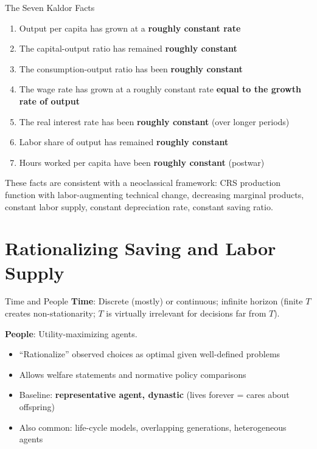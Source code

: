 \documentclass[blue]{beamer}
\begin{document}
\begin{frame}{The Seven Kaldor Facts}
	\begin{enumerate}
		\item Output per capita has grown at a \textbf{roughly constant rate}
		\item The capital-output ratio has remained \textbf{roughly constant}
		\item The consumption-output ratio has been \textbf{roughly constant}
		\item The wage rate has grown at a roughly constant rate \textbf{equal to the growth rate of output}
		\item The real interest rate has been \textbf{roughly constant} (over longer periods)
		\item Labor share of output has remained \textbf{roughly constant}
		\item Hours worked per capita have been \textbf{roughly constant} (postwar)
	\end{enumerate}
	These facts are consistent with a neoclassical framework: CRS production function with labor-augmenting technical change, decreasing marginal products, constant labor supply, constant depreciation rate, constant saving ratio.
\end{frame}
\section{Rationalizing Saving and Labor Supply}

\begin{frame}{Time and People}
	\textbf{Time}: Discrete (mostly) or continuous; infinite horizon (finite $T$ creates non-stationarity; $T$ is virtually irrelevant for decisions far from $T$).
	
	\bigskip
	\textbf{People}: Utility-maximizing agents.
	\begin{itemize}
		\item ``Rationalize'' observed choices as optimal given well-defined problems
		\item Allows welfare statements and normative policy comparisons
		\item Baseline: \textbf{representative agent, dynastic} (lives forever = cares about offspring)
		\item Also common: life-cycle models, overlapping generations, heterogeneous agents
	\end{itemize}
	
\end{frame}
\end{document}
